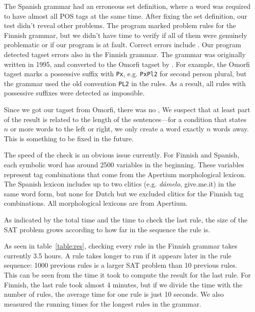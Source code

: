 The Spanish grammar had an erroneous set definition, where a word was required to have almost all POS tags at the same time. After fixing the set definition, our test didn't reveal other problems.
The program marked  problem rules for the Finnish grammar, but we didn't have time to verify if all of them were genuinely problematic or if our program is at fault.
Correct errors include .
Our program detected tagset errors also in the Finnish grammar.
The grammar was originally written in 1995, and converted to the Omorfi tagset by \cite{pirinen2015}. 
For example, the Omorfi tagset marks a possessive suffix with \texttt{Px}, e.g. \texttt{PxPl2} for second person plural, but the grammar used the old convention \texttt{PL2} in the rules.
As a result, all rules with possessive suffixes were detected as impossible.

Since we got our tagset from Omorfi, there was no ,
We suspect that at least part of the result is related to the length of the sentences---for a condition that states $n$ or more words to the left or right, we only create a word exactly $n$ words away. This is something to be fixed in the future.

The speed of the check is an obvious issue currently.
For Finnish and Spanish, each symbolic word has around 2500 variables in the beginning.
These variables represent tag combinations that come from the Apertium morphological lexicon. 
The Spanish lexicon includes up to two clitics (e.g. \emph{dámelo}, give.me.it) in the same word form, but none for Dutch but we excluded clitics for the Finnish tag combinations.
All morphological lexicons are from Apertium.

As indicated by the total time and the time to check the last rule, the size of the SAT problem grows according to how far in the sequence the rule is.

As seen in table~\ref{table:res}, checking every rule in the Finnish grammar takes currently 3.5 hours.
A rule takes longer to run if it appears later in the rule sequence: 1000 previous rules is a larger SAT problem than 10 previous rules.
This can be seen from the time it took to compute the result for the last rule. For Finnish, the last rule took almost 4 minutes, but if we divide the time with the number of rules, the average time for one rule is just 10 seconds.
We also measured the running times for the longest rules in the grammar.


